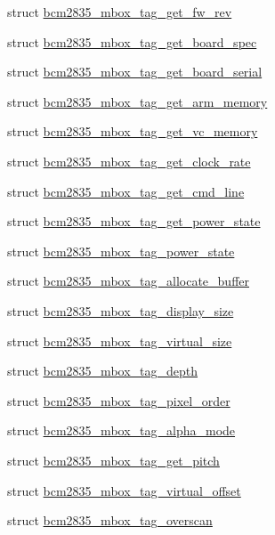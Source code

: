 \begin{DoxyCompactItemize}
struct \mbox{\hyperlink{structbcm2835__mbox__tag__get__fw__rev}{bcm2835\+\_\+mbox\+\_\+tag\+\_\+get\+\_\+fw\+\_\+rev}}
\item 
struct \mbox{\hyperlink{structbcm2835__mbox__tag__get__board__spec}{bcm2835\+\_\+mbox\+\_\+tag\+\_\+get\+\_\+board\+\_\+spec}}
\item 
struct \mbox{\hyperlink{structbcm2835__mbox__tag__get__board__serial}{bcm2835\+\_\+mbox\+\_\+tag\+\_\+get\+\_\+board\+\_\+serial}}
\item 
struct \mbox{\hyperlink{structbcm2835__mbox__tag__get__arm__memory}{bcm2835\+\_\+mbox\+\_\+tag\+\_\+get\+\_\+arm\+\_\+memory}}
\item 
struct \mbox{\hyperlink{structbcm2835__mbox__tag__get__vc__memory}{bcm2835\+\_\+mbox\+\_\+tag\+\_\+get\+\_\+vc\+\_\+memory}}
\item 
struct \mbox{\hyperlink{structbcm2835__mbox__tag__get__clock__rate}{bcm2835\+\_\+mbox\+\_\+tag\+\_\+get\+\_\+clock\+\_\+rate}}
\item 
struct \mbox{\hyperlink{structbcm2835__mbox__tag__get__cmd__line}{bcm2835\+\_\+mbox\+\_\+tag\+\_\+get\+\_\+cmd\+\_\+line}}
\item 
struct \mbox{\hyperlink{structbcm2835__mbox__tag__get__power__state}{bcm2835\+\_\+mbox\+\_\+tag\+\_\+get\+\_\+power\+\_\+state}}
\item 
struct \mbox{\hyperlink{structbcm2835__mbox__tag__power__state}{bcm2835\+\_\+mbox\+\_\+tag\+\_\+power\+\_\+state}}
\item 
struct \mbox{\hyperlink{structbcm2835__mbox__tag__allocate__buffer}{bcm2835\+\_\+mbox\+\_\+tag\+\_\+allocate\+\_\+buffer}}
\item 
struct \mbox{\hyperlink{structbcm2835__mbox__tag__display__size}{bcm2835\+\_\+mbox\+\_\+tag\+\_\+display\+\_\+size}}
\item 
struct \mbox{\hyperlink{structbcm2835__mbox__tag__virtual__size}{bcm2835\+\_\+mbox\+\_\+tag\+\_\+virtual\+\_\+size}}
\item 
struct \mbox{\hyperlink{structbcm2835__mbox__tag__depth}{bcm2835\+\_\+mbox\+\_\+tag\+\_\+depth}}
\item 
struct \mbox{\hyperlink{structbcm2835__mbox__tag__pixel__order}{bcm2835\+\_\+mbox\+\_\+tag\+\_\+pixel\+\_\+order}}
\item 
struct \mbox{\hyperlink{structbcm2835__mbox__tag__alpha__mode}{bcm2835\+\_\+mbox\+\_\+tag\+\_\+alpha\+\_\+mode}}
\item 
struct \mbox{\hyperlink{structbcm2835__mbox__tag__get__pitch}{bcm2835\+\_\+mbox\+\_\+tag\+\_\+get\+\_\+pitch}}
\item 
struct \mbox{\hyperlink{structbcm2835__mbox__tag__virtual__offset}{bcm2835\+\_\+mbox\+\_\+tag\+\_\+virtual\+\_\+offset}}
\item 
struct \mbox{\hyperlink{structbcm2835__mbox__tag__overscan}{bcm2835\+\_\+mbox\+\_\+tag\+\_\+overscan}}
\end{DoxyCompactItemize}
